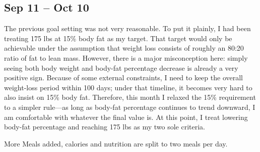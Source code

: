 \subsection{Sep 11 -- Oct 10}
The previous goal setting was not very reasonable. To put it plainly, I had been treating 175 lbs at 15\% body fat as my target. That target would only be achievable under the assumption that weight loss consists of roughly an 80:20 ratio of fat to lean mass. However, there is a major misconception here: simply seeing both body weight and body-fat percentage decrease is already a very positive sign. Because of some external constraints, I need to keep the overall weight-loss period within 100 days; under that timeline, it becomes very hard to also insist on 15\% body fat. Therefore, this month I relaxed the 15\% requirement to a simpler rule---as long as body-fat percentage continues to trend downward, I am comfortable with whatever the final value is. At this point, I treat lowering body-fat percentage and reaching 175 lbs as my two sole criteria. 

More Meals added, calories and nutrition are split to two meals per day.

